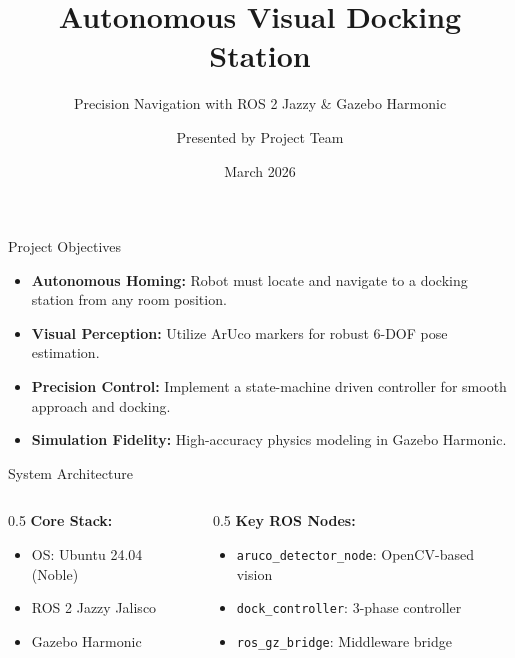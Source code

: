 \documentclass{beamer}
\title[Visual Docking Station]{Autonomous Visual Docking Station}
\subtitle{Precision Navigation with ROS 2 Jazzy \& Gazebo Harmonic}
\author{Presented by Project Team}
\date{March 2026}
\begin{document}
\begin{frame}
    \titlepage
\end{frame}

\begin{frame}{Project Objectives}
    \begin{itemize}
        \item \textbf{Autonomous Homing:} Robot must locate and navigate to a docking station from any room position.
        \item \textbf{Visual Perception:} Utilize ArUco markers for robust 6-DOF pose estimation.
        \item \textbf{Precision Control:} Implement a state-machine driven controller for smooth approach and docking.
        \item \textbf{Simulation Fidelity:} High-accuracy physics modeling in Gazebo Harmonic.
    \end{itemize}
\end{frame}

\begin{frame}{System Architecture}
    \begin{columns}
        \begin{column}{0.5\textwidth}
            \textbf{Core Stack:}
            \begin{itemize}
                \item OS: Ubuntu 24.04 (Noble)
                \item ROS 2 Jazzy Jalisco
                \item Gazebo Harmonic
            \end{itemize}
        \end{column}
        \begin{column}{0.5\textwidth}
            \textbf{Key ROS Nodes:}
            \begin{itemize}
                \item \texttt{aruco\_detector\_node}: OpenCV-based vision
                \item \texttt{dock\_controller}: 3-phase controller
                \item \texttt{ros\_gz\_bridge}: Middleware bridge
            \end{itemize}
        \end{column}
    \end{columns}
\end{frame}
\end{document}
